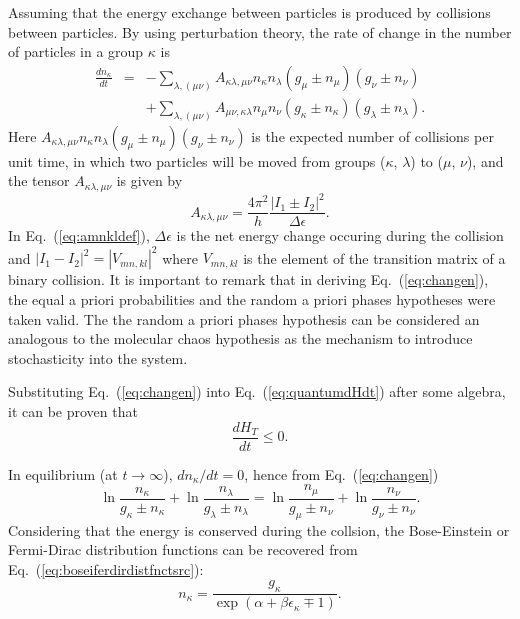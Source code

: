 Assuming that the energy exchange between particles is produced by collisions between particles.
By using perturbation theory, the rate of change in the number of particles in a group $\kappa$ is
%
\begin{eqnarray}\label{eq:changen}
    \frac{d n_{\kappa}}{dt}&=&-\sum_{\lambda,(\mu \nu)}A_{\kappa\lambda,\mu\nu} n_{\kappa}n_{\lambda}(g_{\mu}\pm n_{\mu})(g_{\nu}\pm n_{\nu})\nonumber \\
    &&+\sum_{\lambda,(\mu \nu)}A_{\mu\nu,\kappa\lambda} n_{\mu}n_{\nu}(g_{\kappa}\pm n_{\kappa})(g_{\lambda}\pm n_{\lambda}).
\end{eqnarray}
%
Here $A_{\kappa\lambda,\mu\nu}n_{\kappa}n_{\lambda}(g_{\mu}\pm n_{\mu})(g_{\nu}\pm n_{\nu})$ is the
expected number of collisions per unit time, in which two particles will be moved from groups
($\kappa$, $\lambda$) to ($\mu$, $\nu$), and the tensor $A_{\kappa\lambda,\mu\nu}$ is given by
%
\begin{equation}\label{eq:amnkldef}
  A_{\kappa\lambda,\mu\nu}=\frac{4\pi^{2}}{h}\frac{|I_1\pm I_2|^2}{\Delta \epsilon}.
\end{equation}
%
In Eq.~(\ref{eq:amnkldef}), $\Delta\epsilon$ is the net energy change occuring during the
collision and $|I_1-I_2|^2=|V_{mn,kl}|^2$ where
$V_{mn,kl}$ is the element of the transition matrix of a binary collision.
It is important to remark that in deriving Eq.~(\ref{eq:changen}), the equal a priori
probabilities and the random a priori phases hypotheses were taken valid. The 
the random a priori phases hypothesis can be
considered an analogous to the molecular chaos hypothesis
\cite{bib:das2018} as the mechanism to introduce stochasticity into the system.

Substituting Eq.~(\ref{eq:changen}) into Eq.~(\ref{eq:quantumdHdt}) after some algebra, it can be proven that
%
\begin{equation}
    \frac{dH_T}{dt}\leq 0. \label{eq:H-theorem-tolman}
\end{equation}
%

In equilibrium (at $t\to\infty$), $dn_{\kappa}/dt=0$, hence from Eq.~(\ref{eq:changen})
%
\begin{equation}\label{eq:boseiferdirdistfnctsrc}
    \ln \frac{n_{\kappa}}{g_{\kappa}\pm n_{\kappa}}+\ln \frac{n_{\lambda}}{g_{\lambda}\pm n_{\lambda}}=\ln \frac{n_{\mu}}{g_{\mu}\pm n_{\nu}}+\ln \frac{n_{\nu}}{g_{\nu}\pm n_{\nu}}.
\end{equation}
%
Considering that the energy is conserved during the collsion, the Bose-Einstein or Fermi-Dirac distribution
functions can be recovered from Eq.~(\ref{eq:boseiferdirdistfnctsrc}):
%
\begin{equation}
   n_{\kappa}=\frac{g_{\kappa}}{\exp(\alpha+\beta\epsilon_{\kappa}\mp1)}.
\end{equation}
%

